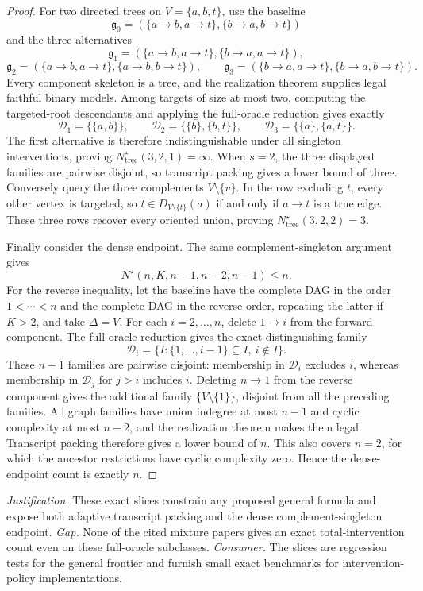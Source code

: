 \documentclass{article}
\begin{document}
\begin{proof}
For two directed trees on \(V=\{a,b,t\}\), use the baseline
\[
 \mathfrak g_0=(\{a\to b,a\to t\},\{b\to a,b\to t\})
\]
and the three alternatives
\[
 \mathfrak g_1=(\{a\to b,a\to t\},\{b\to a,a\to t\}),
\]
\[
 \mathfrak g_2=(\{a\to b,a\to t\},\{a\to b,b\to t\}),
\qquad
 \mathfrak g_3=(\{b\to a,a\to t\},\{b\to a,b\to t\}).
\]
Every component skeleton is a tree, and the realization theorem supplies legal faithful binary models. Among targets of size at most two, computing the targeted-root descendants and applying the full-oracle reduction gives exactly
\[
 \mathscr D_1=\{\{a,b\}\},\qquad
 \mathscr D_2=\{\{b\},\{b,t\}\},\qquad
 \mathscr D_3=\{\{a\},\{a,t\}\}.
\]
The first alternative is therefore indistinguishable under all singleton interventions, proving \(N^{\star}_{\mathrm{tree}}(3,2,1)=\infty\). When \(s=2\), the three displayed families are pairwise disjoint, so transcript packing gives a lower bound of three. Conversely query the three complements \(V\setminus\{v\}\). In the row excluding \(t\), every other vertex is targeted, so \(t\in D_{V\setminus\{t\}}(a)\) if and only if \(a\to t\) is a true edge. These three rows recover every oriented union, proving \(N^{\star}_{\mathrm{tree}}(3,2,2)=3\).

Finally consider the dense endpoint. The same complement-singleton argument gives
\[
 N^{\star}(n,K,n-1,n-2,n-1)\le n.
\]
For the reverse inequality, let the baseline have the complete DAG in the order \(1<\cdots<n\) and the complete DAG in the reverse order, repeating the latter if \(K>2\), and take \(\Delta=V\). For each \(i=2,\ldots,n\), delete \(1\to i\) from the forward component. The full-oracle reduction gives the exact distinguishing family
\[
 \mathscr D_i=\{I:\{1,\ldots,i-1\}\subseteq I,\ i\notin I\}.
\]
These \(n-1\) families are pairwise disjoint: membership in \(\mathscr D_i\) excludes \(i\), whereas membership in \(\mathscr D_j\) for \(j>i\) includes \(i\). Deleting \(n\to1\) from the reverse component gives the additional family \(\{V\setminus\{1\}\}\), disjoint from all the preceding families. All graph families have union indegree at most \(n-1\) and cyclic complexity at most \(n-2\), and the realization theorem makes them legal. Transcript packing therefore gives a lower bound of \(n\). This also covers \(n=2\), for which the ancestor restrictions have cyclic complexity zero. Hence the dense-endpoint count is exactly \(n\).
\end{proof}
\par\smallskip\noindent \textit{Justification.} These exact slices constrain any proposed general formula and expose both adaptive transcript packing and the dense complement-singleton endpoint. \textit{Gap.} None of the cited mixture papers gives an exact total-intervention count even on these full-oracle subclasses. \textit{Consumer.} The slices are regression tests for the general frontier and furnish small exact benchmarks for intervention-policy implementations.
\end{document}
